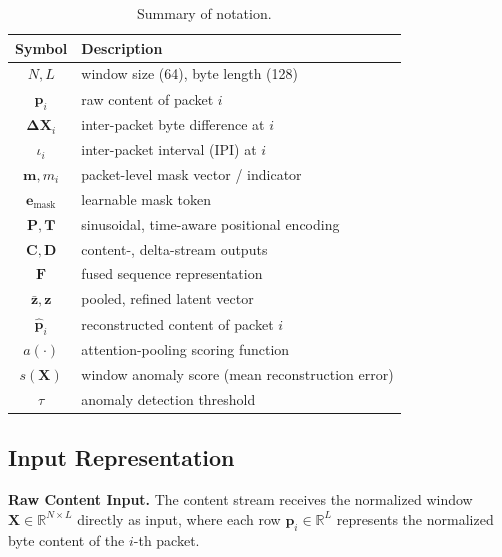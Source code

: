 \begin{table}[!htbp]
\centering
\caption{Summary of notation.}
\label{tab:notation}
\footnotesize
\begin{tabular}{cp{}}
\toprule
\textbf{Symbol} & \textbf{Description} \\
\midrule
$N, L$                          & window size (64), byte length (128) \\
$\mathbf{p}_i$                  & raw content of packet $i$ \\
$\mathbf{\Delta X}_i$           & inter-packet byte difference at $i$ \\
$\iota_i$                       & inter-packet interval (IPI) at $i$ \\
$\mathbf{m}, m_i$                & packet-level mask vector / indicator \\
$\mathbf{e}_{\text{mask}}$      & learnable mask token \\
$\mathbf{P}, \mathbf{T}$        & sinusoidal, time-aware positional encoding \\
$\mathbf{C}, \mathbf{D}$        & content-, delta-stream outputs \\
$\mathbf{F}$                    & fused sequence representation \\
$\bar{\mathbf{z}}, \mathbf{z}$  & pooled, refined latent vector \\
$\hat{\mathbf{p}}_i$            & reconstructed content of packet $i$ \\
$a(\cdot)$                      & attention-pooling scoring function \\
$s(\mathbf{X})$                 & window anomaly score (mean reconstruction error) \\
$\tau$                          & anomaly detection threshold \\
\bottomrule
\end{tabular}
\end{table}

\subsection{Input Representation}

\noindent\textbf{Raw Content Input.}
The content stream receives the normalized window $\mathbf{X} \in \mathbb{R}^{N \times L}$ directly as input, where each row $\mathbf{p}_i \in \mathbb{R}^{L}$ represents the normalized byte content of the $i$-th packet.


